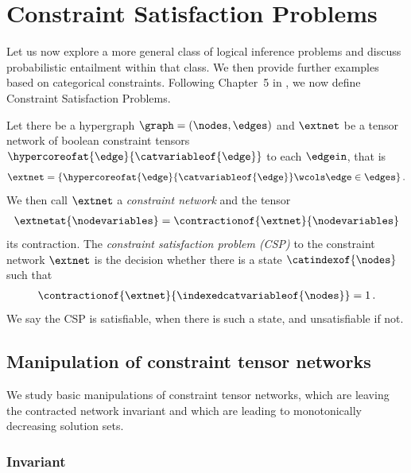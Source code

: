 \section{Constraint Satisfaction Problems}

Let us now explore a more general class of logical inference problems and discuss probabilistic entailment within that class.
We then provide further examples based on categorical constraints.
Following Chapter~5 in \cite{russell_artificial_2021}, we now define Constraint Satisfaction Problems.

\begin{definition}\label{def:csp}
    Let there be a hypergraph $\graph=(\nodes,\edges)$ and $\extnet$ be a tensor network of boolean constraint tensors $\hypercoreofat{\edge}{\catvariableof{\edge}}$ to each $\edgein$, that is
    \begin{align*}
        \extnet = \{ \hypercoreofat{\edge}{\catvariableof{\edge}} \wcols \edge\in\edges \} \, .
    \end{align*}
    We then call $\extnet$ a \emph{constraint network} and the tensor
    \begin{align*} %
        \extnetat{\nodevariables}
        = \contractionof{\extnet}{\nodevariables}
    \end{align*}
    its contraction.
    The \emph{constraint satisfaction problem (CSP)} to the constraint network $\extnet$ is the decision whether there is a state $\catindexof{\nodes}$ such that
    \begin{align*}
        \contractionof{\extnet}{\indexedcatvariableof{\nodes}} = 1 \, .
    \end{align*}
    We say the CSP is satisfiable, when there is such a state, and unsatisfiable if not.
\end{definition}





\subsection{Manipulation of constraint tensor networks}

We study basic manipulations of constraint tensor networks, which are leaving the contracted network invariant and which are leading to monotonically decreasing solution sets.

\subsubsection{Invariant}

